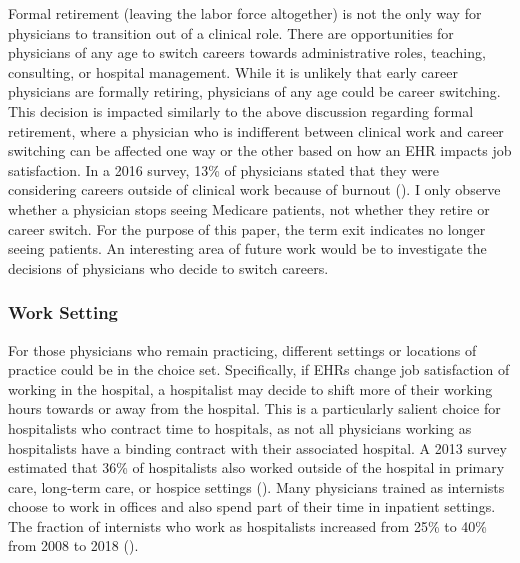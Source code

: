 \documentclass[12pt]{article}
\begin{document}
Formal retirement (leaving the labor force altogether) is not the only way for physicians to transition out of a clinical role. There are opportunities for physicians of any age to switch careers towards administrative roles, teaching, consulting, or hospital management. While it is unlikely that early career physicians are formally retiring, physicians of any age could be career switching. This decision is impacted similarly to the above discussion regarding formal retirement, where a physician who is indifferent between clinical work and career switching can be affected one way or the other based on how an EHR impacts job satisfaction. In a 2016 survey, 13\% of physicians stated that they were considering careers outside of clinical work because of burnout (\cite{physicians2016physicians}). I only observe whether a physician stops seeing Medicare patients, not whether they retire or career switch. For the purpose of this paper, the term exit indicates no longer seeing patients. An interesting area of future work would be to investigate the decisions of physicians who decide to switch careers.



\subsubsection{Work Setting}\label{sec:worksetting}

For those physicians who remain practicing, different settings or locations of practice could be in the choice set. Specifically, if EHRs change job satisfaction of working in the hospital, a hospitalist may decide to shift more of their working hours towards or away from the hospital. This is a particularly salient choice for hospitalists who contract time to hospitals, as not all physicians working as hospitalists have a binding contract with their associated hospital. A 2013 survey estimated that 36\% of hospitalists also worked outside of the hospital in primary care, long-term care, or hospice settings (\cite{Today}). Many physicians trained as internists choose to work in offices and also spend part of their time in inpatient settings. The fraction of internists who work as hospitalists increased from 25\% to 40\% from 2008 to 2018 (\cite{gray2022evolving}).  
\end{document}
